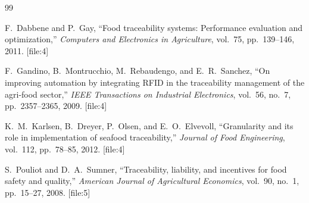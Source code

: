 \documentclass[eng]{ajceam-class}
\begin{document}

\begin{thebibliography}{99}

F.~Dabbene and P.~Gay,
``Food traceability systems: Performance evaluation and optimization,''
\emph{Computers and Electronics in Agriculture}, vol.~75, pp.~139--146, 2011. [file:4]

F.~Gandino, B.~Montrucchio, M.~Rebaudengo, and E.~R.~Sanchez,
``On improving automation by integrating RFID in the traceability management of the agri-food sector,''
\emph{IEEE Transactions on Industrial Electronics}, vol.~56, no.~7, pp.~2357--2365, 2009. [file:4]

K.~M.~Karlsen, B.~Dreyer, P.~Olsen, and E.~O.~Elvevoll,
``Granularity and its role in implementation of seafood traceability,''
\emph{Journal of Food Engineering}, vol.~112, pp.~78--85, 2012. [file:4]

S.~Pouliot and D.~A.~Sumner,
``Traceability, liability, and incentives for food safety and quality,''
\emph{American Journal of Agricultural Economics}, vol.~90, no.~1, pp.~15--27, 2008. [file:5]

\end{thebibliography}
\end{document}
